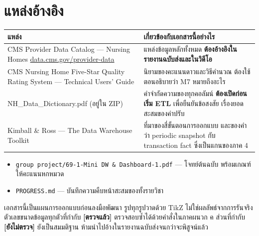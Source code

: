 \documentclass[11pt,a4paper]{article}
\newcommand{\sansall}{\sffamily}
\newcommand{\code}[1]{\texttt{#1}}
\newcommand{\ok}{\textcolor{dw}{\textbf{[ตรวจแล้ว]}}}
\newcommand{\tbc}{\textcolor{etl}{\textbf{[ยังไม่ตรวจ]}}}
\begin{document}
\section{แหล่งอ้างอิง}

\begin{table}[H]\centering\small
\begin{tabular}{L{5.4cm} L{10.0cm}}
\toprule
\sansall\bfseries แหล่ง & \sansall\bfseries เกี่ยวข้องกับเอกสารนี้อย่างไร \\
\midrule
CMS Provider Data Catalog --- Nursing Homes \newline
\url{data.cms.gov/provider-data} &
  แหล่งข้อมูลหลักทั้งหมด \textbf{ต้องอ้างอิงในรายงานฉบับส่งและในวิดีโอ} \\
\addlinespace
CMS Nursing Home Five-Star Quality Rating System --- Technical Users' Guide &
  นิยามของคะแนนดาวและวิธีคำนวณ ต้องใช้ตอนอธิบายว่า M7 หมายถึงอะไร \\
\addlinespace
NH\_Data\_Dictionary.pdf (อยู่ใน ZIP) &
  คำจำกัดความของทุกคอลัมน์ \textbf{ต้องเปิดก่อนเริ่ม ETL} เพื่อยืนยันข้อสงสัย
  เรื่องยอดสะสมของค่าปรับ \\
\addlinespace
Kimball \& Ross --- The Data Warehouse Toolkit &
  ที่มาของสี่ขั้นตอนการออกแบบ และของคำว่า periodic snapshot กับ transaction fact
  ซึ่งเป็นแกนของภาค 4 \\
\bottomrule
\end{tabular}
\end{table}

\begin{keybox}[title={เอกสารภายในโครงงานที่ควรอ่านคู่กัน}]
\begin{itemize}
\item \code{group project/69-1-Mini DW \& Dashboard-1.pdf} --- โจทย์ต้นฉบับ
      พร้อมเกณฑ์ให้คะแนนหกหมวด
\item \code{PROGRESS.md} --- บันทึกความคืบหน้าสะสมของทั้งรายวิชา
\end{itemize}
\end{keybox}

\vfill
\begin{center}
\end{center}
{\sansall\footnotesize\color{muted}
เอกสารนี้เป็นแผนการออกแบบก่อนลงมือพัฒนา รูปทุกรูปวาดด้วย TikZ ไม่ใช่ผลลัพธ์จากการรันจริง
ตัวเลขขนาดข้อมูลทุกตัวที่กำกับ \ok{} ตรวจสอบซ้ำได้ด้วยคำสั่งในภาคผนวก ค
ส่วนที่กำกับ \tbc{} ยังเป็นสมมติฐาน ห้ามนำไปอ้างในรายงานฉบับส่งจนกว่าจะพิสูจน์แล้ว\par}
\end{document}
